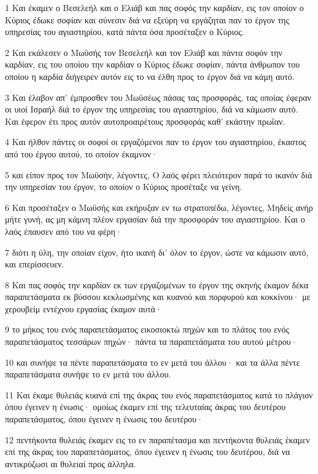 \par 1 Και έκαμεν ο Βεσελεήλ και ο Ελιάβ και πας σοφός την καρδίαν, εις τον οποίον ο Κύριος έδωκε σοφίαν και σύνεσιν διά να εξεύρη να εργάζηται παν το έργον της υπηρεσίας του αγιαστηρίου, κατά πάντα όσα προσέταξεν ο Κύριος.
\par 2 Και εκάλεσεν ο Μωϋσής τον Βεσελεήλ και τον Ελιάβ και πάντα σοφόν την καρδίαν, εις του οποίου την καρδίαν ο Κύριος έδωκε σοφίαν, πάντα άνθρωπον του οποίου η καρδία διήγειρεν αυτόν εις το να έλθη προς το έργον διά να κάμη αυτό.
\par 3 Και έλαβον απ' έμπροσθεν του Μωϋσέως πάσας τας προσφοράς, τας οποίας έφεραν οι υιοί Ισραήλ διά το έργον της υπηρεσίας του αγιαστηρίου, διά να κάμωσιν αυτό. Και έφερον έτι προς αυτόν αυτοπροαιρέτους προσφοράς καθ' εκάστην πρωΐαν.
\par 4 Και ήλθον πάντες οι σοφοί οι εργαζόμενοι παν το έργον του αγιαστηρίου, έκαστος από του έργου αυτού, το οποίον έκαμνον·
\par 5 και είπον προς τον Μωϋσήν, λέγοντες, Ο λαός φέρει πλειότερον παρά το ικανόν διά την υπηρεσίαν του έργον, το οποίον ο Κύριος προσέταξε να γείνη.
\par 6 Και προσέταξεν ο Μωϋσής και εκήρυξαν εν τω στρατοπέδω, λέγοντες, Μηδείς ανήρ μήτε γυνή, ας μη κάμνη πλέον εργασίαν διά την προσφοράν του αγιαστηρίου. Και ο λαός έπαυσεν από του να φέρη·
\par 7 διότι η ύλη, την οποίαν είχον, ήτο ικανή δι' όλον το έργον, ώστε να κάμωσιν αυτό, και επερίσσευεν.
\par 8 Και πας σοφός την καρδίαν εκ των εργαζομένων το έργον της σκηνής έκαμον δέκα παραπετάσματα εκ βύσσου κεκλωσμένης και κυανού και πορφυρού και κοκκίνου· με χερουβείμ εντέχνου εργασίας έκαμον αυτά·
\par 9 το μήκος του ενός παραπετάσματος εικοσιοκτώ πηχών και το πλάτος του ενός παραπετάσματος τεσσάρων πηχών· πάντα τα παραπετάσματα του αυτού μέτρου·
\par 10 και συνήψε τα πέντε παραπετάσματα το εν μετά του άλλου· και τα άλλα πέντε παραπετάσματα συνήψε το εν μετά του άλλου.
\par 11 Και έκαμε θυλειάς κυανά επί της άκρας του ενός παραπετάσματος κατά το πλάγιον όπου έγεινεν η ένωσις· ομοίως έκαμεν επί της τελευταίας άκρας του δευτέρου παραπετάσματος, όπου έγεινεν η ένωσις του δευτέρου·
\par 12 πεντήκοντα θυλειάς έκαμεν εις το εν παραπέτασμα και πεντήκοντα θυλειάς έκαμεν επί της άκρας του παραπετάσματος, όπου έγεινεν η ένωσις του δευτέρου, διά να αντικρύζωσι αι θυλειαί προς άλληλα.

